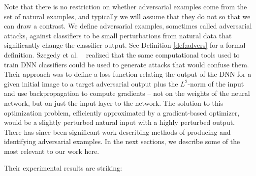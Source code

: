 Note that there is no restriction on whether adversarial examples come from the set of natural examples, and typically we will assume that they do not so that we can draw a contrast. 
We define adversarial examples, sometimes called adversarial attacks, against classifiers
to be small perturbations from natural data that significantly change the classifier output. See Definition \ref{def:advers} for a formal definition.
Szegedy et al. 
~\cite{szegedy2013} realized that the same computational tools
used to train DNN classifiers could be used to generate attacks that would
confuse them. Their approach was to define a loss function
relating the output of the DNN for a given initial image to a target adversarial 
output plus the $L^2$-norm of the input and use backpropagation to 
compute gradients -- not on the weights of the neural network, but on
just the input layer to the network. The solution to this optimization
problem, efficiently approximated by a gradient-based optimizer, would
be a slightly perturbed natural input with a highly perturbed
output. There has since been significant work describing methods of producing and identifying
adversarial examples. In the next sections, we describe some of the most relevant
to our work here.

Their experimental results are striking:\\

